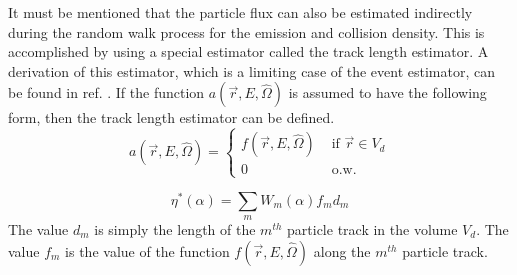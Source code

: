 It must be mentioned that the particle flux can also be estimated indirectly
during the random walk process for the emission and collision density. This
is accomplished by using a special estimator called the track length estimator.
A derivation of this estimator, which is a limiting case of the event 
estimator, can be found in ref. \citep{spanier_monte_1969}. If the function
$a(\vec{r},E,\hat{\Omega})$ is assumed to have the following form, then the 
track length estimator can be defined. 
\begin{equation*}
  a(\vec{r},E,\hat{\Omega}) = 
  \begin{cases}
    f(\vec{r},E,\hat{\Omega}) & \text{ if } \vec{r} \in V_d \\
    0 & \text{ o.w.}
  \end{cases}
\end{equation*}

\begin{equation}
  \eta^{*}(\alpha) = \sum_m W_m(\alpha)f_md_m
\end{equation}
The value $d_m$ is simply the length of the $m^{th}$ particle track in the 
volume $V_d$. The value $f_m$ is the value of the function 
$f(\vec{r},E,\hat{\Omega})$ along the $m^{th}$ particle track. 
